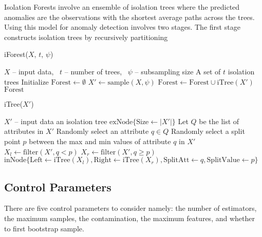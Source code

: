 \documentclass[10pt, conference]{IEEEtran}
\begin{document}
Isolation Forests involve an ensemble of isolation trees where the predicted anomalies are the observations with the shortest average paths across the trees. Using this model for anomaly detection involves two stages. The first stage constructs isolation trees by recursively partitioning 

\begin{algorithm}[H]
	\caption{iForest($X$, $t$, $\psi$)}
	\label{alg:iforest}
	\begin{algorithmic}[1]
		\Require $X$ -- input data, \ $t$ -- number of trees, \ $\psi$ -- subsampling size
		\Ensure A set of $t$ isolation trees
		\State Initialize $\text{Forest} \gets \emptyset$
		\State $X' \gets \text{sample}(X, \psi)$
		\State $\text{Forest} \gets \text{Forest} \cup \text{iTree}(X')$
		\EndFor \\
		\Return $\text{Forest}$
	\end{algorithmic}
\end{algorithm}



\begin{algorithm}[H]
	\caption{iTree($X'$)}
	\label{alg:itree}
	\begin{algorithmic}[1]
		\Require $X'$ -- input data  
		\Ensure an isolation tree
		\Return $\text{exNode}\{\text{Size} \leftarrow |X'|\}$
		\Else
		\State Let $Q$ be the list of attributes in $X'$
		\State Randomly select an attribute $q \in Q$
		\State Randomly select a split point $p$ between the max and min values of attribute $q$ in $X'$
		\State $X_l \gets \text{filter}(X', q < p)$
		\State $X_r \gets \text{filter}(X', q \ge p)$
		\Return $\text{inNode}\{\text{Left} \leftarrow \text{iTree}(X_l), \text{Right} \leftarrow \text{iTree}(X_r), \text{SplitAtt} \leftarrow q, \text{SplitValue} \leftarrow p\}$
		\EndIf
	\end{algorithmic}
\end{algorithm}



\subsection{Control Parameters}
There are five control parameters to consider namely: the number of estimators, the maximum samples, the contamination, the maximum features, and whether to first bootstrap sample.
\end{document}
